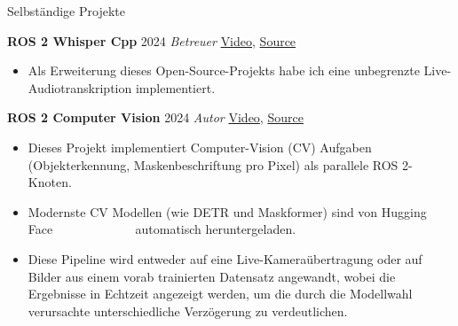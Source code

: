 \begin{rubric}{Selbständige Projekte}

\entry*[] \textbf{ROS 2 Whisper Cpp} \hfill 2024 \newline 
\emph{Betreuer} \hfill \href{https://github.com/ros-ai/ros2_whisper/blob/main/doc/harry_potter_sample.gif}{Video}, \href{https://github.com/ros-ai/ros2_whisper}{\faGithub Source} \newline  
\vspace{\CVItemizeHeaderSpacing} \begin{itemize}[leftmargin=*, rightmargin=1cm]
	\setlength{\itemsep}{\CVItemizeSpacing}
	\item Als Erweiterung dieses Open-Source-Projekts habe ich eine unbegrenzte Live-Audiotranskription implementiert. 
\end{itemize}  

\entry*[] \textbf{ROS 2 Computer Vision} \hfill 2024 \newline \emph{Autor} \hfill \href{https://github.com/NathanCorral/ROS-HF-Vision/blob/main/doc/gifs/ex_german_roads.gif}{Video}, \href{https://github.com/NathanCorral/ROS-HF-Vision/tree/main}{\faGithub Source} \newline  
\vspace{\CVItemizeHeaderSpacing} \begin{itemize}[leftmargin=*, rightmargin=1cm] 
	\setlength{\itemsep}{\CVItemizeSpacing}  
	\item Dieses Projekt implementiert Computer-Vision (CV) Aufgaben (Objekterkennung, Maskenbeschriftung pro Pixel) als parallele ROS 2-Knoten.
	\item Modernste CV Modellen (wie DETR und Maskformer) sind von Hugging Face ~~~~~~~~~~~~ automatisch heruntergeladen.
	\item Diese Pipeline wird entweder auf eine Live-Kameraübertragung oder auf Bilder aus einem vorab trainierten Datensatz angewandt, wobei die Ergebnisse in Echtzeit angezeigt werden, um die durch die Modellwahl verursachte unterschiedliche Verzögerung zu verdeutlichen.
\end{itemize}  


\end{rubric}
